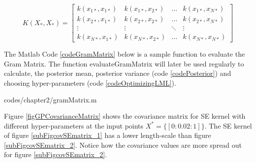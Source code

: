 \begin{equation}\label{eqnCovMatrixSquaredExponential}
K(X_{*}, X_{*} ) = \left [ \begin{matrix}
k(x_{1*}, x_{1*}) & k(x_{1*}, x_{2*}) & \ldots & k(x_{1*}, x_{N*})
\\ k(x_{2*}, x_{1*}) & k(x_{2*}, x_{2*}) & \ldots & k(x_{2*}, x_{N*})
\\ \vdots & \vdots & \ddots & \vdots
\\ k(x_{N*}, x_{1*}) & k(x_{N*}, x_{2*}) & \ldots & k(x_{N*}, x_{N*})
\end{matrix} \right ] 
\end{equation}

The Matlab Code \ref{codeGramMatrix} below is a sample function to evaluate the Gram Matrix. The function  evaluateGramMatrix will later be used regularly to calculate, the posterior mean, posterior variance (code \ref{codePosterior}) and choosing hyper-parameters (code \ref{codeOptimizingLML}).
\begin{mdframed}[hidealllines=true,backgroundcolor=lightgray!20]

                    {codes/chapter2/gramMatrix.m}
\end{mdframed}

Figure \ref{figGPCovarianceMatrix} shows the covariance matrix for SE kernel with different hyper-parameters at the input points $X^{*} = \{[0:0.02:1]\}$. The SE kernel of figure \ref{subFigcovSEmatrix_1} has a lower length-scale than figure \ref{subFigcovSEmatrix_2}. Notice how the covariance values are more spread out for figure \ref{subFigcovSEmatrix_2}.

